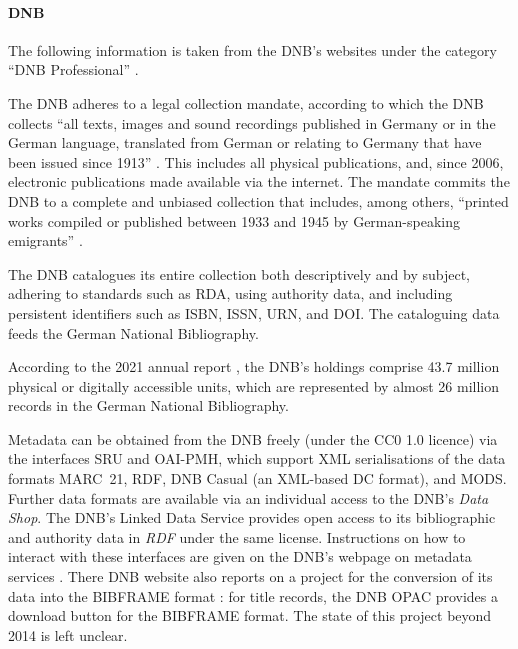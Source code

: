 \paragraph{DNB}

The following information is taken from the \gls{DNB}'s websites under the category \enquote{DNB Professional} \autocite{DNB_coll_mand,DNB_cataloguing,DNB_metadata}.

The DNB adheres to a legal collection mandate, according to which
the DNB collects \enquote{all texts, images and sound recordings published in Germany or in the German language, translated from German or relating to Germany that have been issued since 1913}  \autocite{DNB_coll_mand}. This includes all physical publications, and, since 2006, electronic publications made available via the internet. The mandate commits the DNB to a complete and unbiased collection that includes, among others, \enquote{printed works compiled or published between 1933 and 1945 by German-speaking emigrants} \autocite{DNB_coll_mand}.

The DNB catalogues its entire collection both descriptively and by subject, 
adhering to standards such as \gls{RDA}, using authority data, and including persistent identifiers such as ISBN, ISSN, URN, and DOI.
The cataloguing data feeds the German National Bibliography.

According to the 2021 annual report \autocite{DNB_Jahresbericht_2021},
the DNB's holdings comprise 43.7 million physical or digitally accessible units, 
which are represented by almost 26 million records in the German National Bibliography.

Metadata can be obtained from the DNB freely (under the CC0 1.0 licence) via the interfaces
\gls{SRU} and \gls{OAI-PMH}, which support \gls{XML} serialisations of the data formats
\gls{MARC}~21, \gls{RDF}, DNB Casual (an \gls{XML}-based \gls{DC} format), and \gls{MODS}.
Further data formats are available via an individual access
to the DNB's \emph{Data Shop}.
The DNB's Linked Data Service provides open access to its bibliographic and authority data
in \emph{RDF} under the same license. Instructions on how to interact with these interfaces
are given on the DNB's webpage on metadata services \autocite{DNB_metadata}.
There DNB website also reports on a project for the conversion of its data
into the \gls{BIBFRAME} format \autocite[cf.][]{DNBBIBFRAME}:
for title records, the DNB OPAC provides a download button for the BIBFRAME format.
The state of this project beyond 2014 is left unclear.

